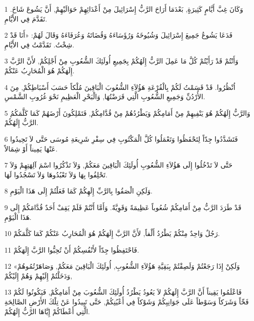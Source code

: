 \par 1 وَكَانَ غِبَّ أَيَّامٍ كَثِيرَةٍ, بَعْدَمَا أَرَاحَ الرَّبُّ إِسْرَائِيلَ مِنْ أَعْدَائِهِمْ حَوَالَيْهِمْ, أَنَّ يَشُوعَ شَاخَ. تَقَدَّمَ فِي الأَيَّامِ.
\par 2 فَدَعَا يَشُوعُ جَمِيعَ إِسْرَائِيلَ وَشُيُوخَهُ وَرُؤَسَاءَهُ وَقُضَاتَهُ وَعُرَفَاءَهُ وَقَالَ لَهُمْ: «أَنَا قَدْ شِخْتُ. تَقَدَّمْتُ فِي الأَيَّامِ.
\par 3 وَأَنْتُمْ قَدْ رَأَيْتُمْ كُلَّ مَا عَمِلَ الرَّبُّ إِلَهُكُمْ بِجَمِيعِ أُولَئِكَ الشُّعُوبِ مِنْ أَجْلِكُمْ, لأَنَّ الرَّبَّ إِلَهَكُمْ هُوَ الْمُحَارِبُ عَنْكُمْ.
\par 4 اُنْظُرُوا. قَدْ قَسَمْتُ لَكُمْ بِالْقُرْعَةِ هَؤُلاَءِ الشُّعُوبَ الْبَاقِينَ مُلْكاً حَسَبَ أَسْبَاطِكُمْ, مِنَ الأُرْدُنِّ وَجَمِيعِ الشُّعُوبِ الَّتِي قَرَضْتُهَا, وَالْبَحْرِ الْعَظِيمِ نَحْوَ غُرُوبِ الشَّمْسِ.
\par 5 وَالرَّبُّ إِلَهُكُمْ هُوَ يَنْفِيهِمْ مِنْ أَمَامِكُمْ وَيَطْرُدُهُمْ مِنْ قُدَّامِكُمْ, فَتَمْلِكُونَ أَرْضَهُمْ كَمَا كَلَّمَكُمُ الرَّبُّ إِلَهُكُمْ.
\par 6 فَتَشَدَّدُوا جِدّاً لِتَحْفَظُوا وَتَعْمَلُوا كُلَّ الْمَكْتُوبِ فِي سِفْرِ شَرِيعَةِ مُوسَى حَتَّى لاَ تَحِيدُوا عَنْهَا يَمِيناً أَوْ شِمَالاً.
\par 7 حَتَّى لاَ تَدْخُلُوا إِلَى هَؤُلاَءِ الشُّعُوبِ أُولَئِكَ الْبَاقِينَ مَعَكُمْ, وَلاَ تَذْكُرُوا اسْمَ آلِهَتِهِمْ وَلاَ تَحْلِفُوا بِهَا وَلاَ تَعْبُدُوهَا وَلاَ تَسْجُدُوا لَهَا.
\par 8 وَلَكِنِ الْصَقُوا بِالرَّبِّ إِلَهِكُمْ كَمَا فَعَلْتُمْ إِلَى هَذَا الْيَوْمِ.
\par 9 قَدْ طَرَدَ الرَّبُّ مِنْ أَمَامِكُمْ شُعُوباً عَظِيمَةً وَقَوِيَّةً. وَأَمَّا أَنْتُمْ فَلَمْ يَقِفْ أَحَدٌ قُدَّامَكُمْ إِلَى هَذَا الْيَوْمِ.
\par 10 رَجُلٌ وَاحِدٌ مِنْكُمْ يَطْرُدُ أَلْفاً, لأَنَّ الرَّبَّ إِلَهَكُمْ هُوَ الْمُحَارِبُ عَنْكُمْ كَمَا كَلَّمَكُمْ.
\par 11 فَاحْتَفِظُوا جِدّاً لأَنْفُسِكُمْ أَنْ تُحِبُّوا الرَّبَّ إِلَهَكُمْ.
\par 12 «وَلَكِنْ إِذَا رَجَعْتُمْ وَلَصِقْتُمْ بِبَقِيَّةِ هَؤُلاَءِ الشُّعُوبِ, أُولَئِكَ الْبَاقِينَ مَعَكُمْ, وَصَاهَرْتُمُوهُمْ وَدَخَلْتُمْ إِلَيْهِمْ وَهُمْ إِلَيْكُمْ,
\par 13 فَاعْلَمُوا يَقِيناً أَنَّ الرَّبَّ إِلَهَكُمْ لاَ يَعُودُ يَطْرُدُ أُولَئِكَ الشُّعُوبَ مِنْ أَمَامِكُمْ, فَيَكُونُوا لَكُمْ فَخّاً وَشَرَكاً وَسَوْطاً عَلَى جَوَانِبِكُمْ وَشَوْكاً فِي أَعْيُنِكُمْ, حَتَّى تَبِيدُوا عَنْ تِلْكَ الأَرْضِ الصَّالِحَةِ الَّتِي أَعْطَاكُمْ إِيَّاهَا الرَّبُّ إِلَهُكُمْ.
